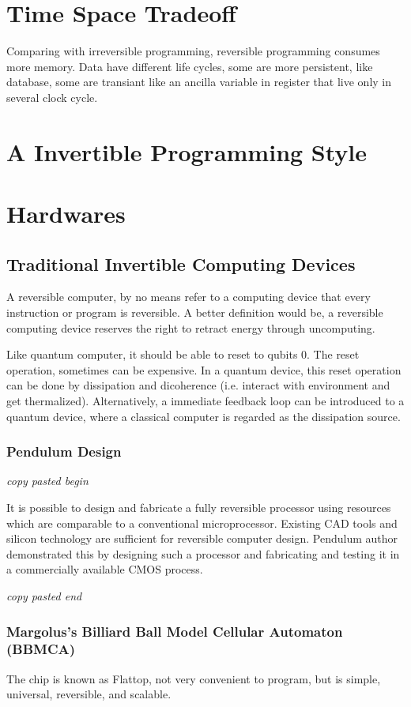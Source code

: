 \documentclass{article}
\newcommand{\<}{\langle}
\renewcommand{\>}{\rangle}
\begin{document}
\section{Time Space Tradeoff}
Comparing with irreversible programming, reversible programming consumes more memory.
Data have different life cycles, some are more persistent, like database, some are transiant like an ancilla variable in register that live only in several clock cycle.


\section{A Invertible Programming Style}
\section{Hardwares}
\subsection{Traditional Invertible Computing Devices}
A reversible computer, by no means refer to a computing device that every instruction or program is reversible. A better definition would be, a reversible computing device reserves the right to retract energy through uncomputing.

Like quantum computer, it should be able to reset to qubits $0$. The reset operation, sometimes can be expensive. In a quantum device, this reset operation can be done by dissipation and dicoherence (i.e. interact with environment and get thermalized). Alternatively, a immediate feedback loop can be introduced to a quantum device, where a classical computer is regarded as the dissipation source.

\subsubsection{Pendulum Design}
\textit{copy pasted begin}

It is possible to design and fabricate a fully reversible processor using resources which are comparable to a conventional microprocessor. Existing CAD tools and silicon technology are sufficient for reversible computer design.
Pendulum author demonstrated this by designing such a processor and fabricating and testing it in a commercially available CMOS process.

\textit{copy pasted end}


\subsubsection{Margolus's Billiard Ball Model Cellular Automaton (BBMCA)}
The chip is known as Flattop, not very convenient to program, but is simple, universal, reversible, and scalable.
\end{document}
